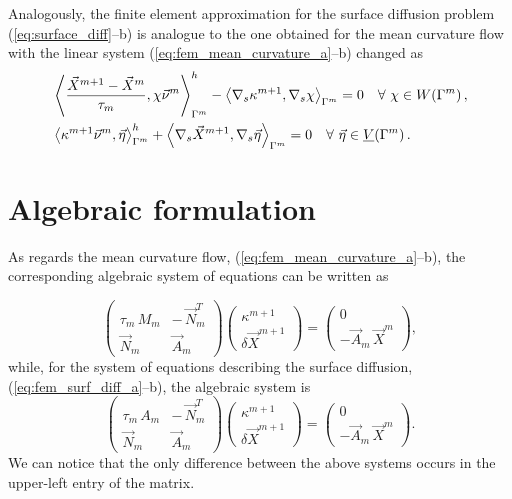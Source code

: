 Analogously, the finite element approximation for the surface diffusion problem
(\ref{eq:surface_diff}--b) is analogue to the one obtained for the mean
curvature flow with the linear system (\ref{eq:fem_mean_curvature_a}--b)
changed as
\begin{subequations}
\begin{align}
&\left\langle \frac{\vec{X}^{m + 1} - \vec{X}^{m}}{\tau_m},
\chi\vec{\nu}^m\right\rangle_{\Gamma^m}^{h} - \left\langle\nabla_s\kappa^{m+1},
\nabla_s\chi\right\rangle_{\Gamma^m}=0\quad \forall\ \chi \in
W(\Gamma^m)\,,\label{eq:fem_surf_diff_a}\\
&\left\langle\kappa^{m+1}\vec{\nu}^m, \vec{\eta}\right\rangle_{\Gamma^m}^{h} +
\left\langle\nabla_s\vec{X}^{m + 1},
\nabla_s\vec{\eta}\right\rangle_{\Gamma^m}=0\quad \forall\ \vec\eta \in \underline{V}(\Gamma^m)\,.
\label{eq:fem_surf_diff_b}
\end{align}
\end{subequations}

\section[Algebraic formulation]{Algebraic formulation}
As regards the mean curvature flow, (\ref{eq:fem_mean_curvature_a}--b), the
corresponding algebraic system of equations can be written as

\begin{equation}\label{eq:algebraic_mean_curvature}
\begin{pmatrix}
\tau_m \, M_m & - \, \vec{N}_{m}^{T} \\
\vec{N}_m & \vec{A}_m
\end{pmatrix}
\begin{pmatrix}
\kappa^{m + 1} \\
\delta \vec{X}^{m + 1}
\end{pmatrix}
=
\begin{pmatrix}
0 \\
- \vec{A}_m \, \vec{X}^{m}
\end{pmatrix} ,
\end{equation}
while, for the system of equations describing the surface diffusion,
(\ref{eq:fem_surf_diff_a}--b), the algebraic system is
\begin{equation}\label{eq:algebraic_surf_diff}
\begin{pmatrix}
\tau_m \, A_m & - \, \vec{N}_{m}^{T} \\
\vec{N}_m & \vec{A}_m
\end{pmatrix}
\begin{pmatrix}
\kappa^{m + 1} \\
\delta \vec{X}^{m + 1}
\end{pmatrix}
=
\begin{pmatrix}
0 \\
- \vec{A}_m \, \vec{X}^{m}
\end{pmatrix}.
\end{equation}
We can notice that the only difference between the above systems occurs in the
upper-left entry of the matrix.

